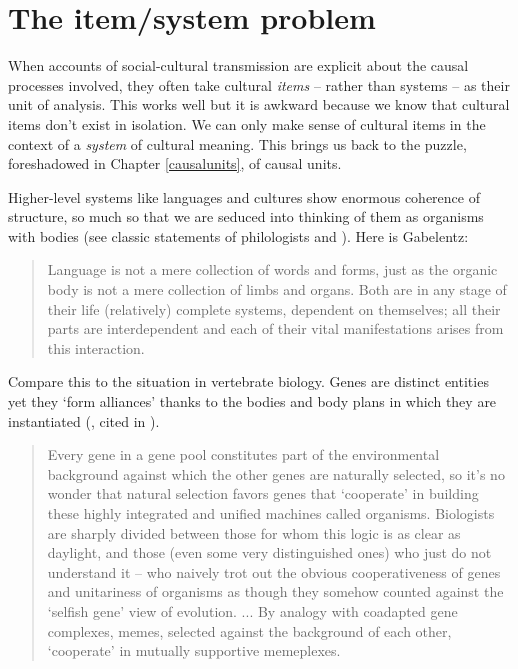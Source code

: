 
\chapter{The item/system problem}
\label{itemsystemproblem}


When accounts of social-cultural transmission are explicit about the 
causal processes involved, they often take cultural \textit{items} -- rather than systems -- as their unit of analysis. This works well 
but it is awkward because we know that cultural items don't exist in 
isolation. We can only make sense of cultural items in the context of a 
\textit{system} of cultural meaning. This brings us back to the puzzle, foreshadowed in Chapter \ref{causalunits}, of causal units. 



Higher-level systems like languages and cultures show enormous coherence 
of structure, so much so that we are seduced into thinking of them as organisms with 
bodies (see classic statements of philologists \citealt{gabelentz_sprachwissenschaft_1891} and \citealt[16]{meillet_linguistique_1926}). Here is Gabelentz:

\begin{quotation}
Language is not a mere collection of words and forms, just as the organic body is not a mere collection of limbs and organs. Both are in any stage of their life (relatively) complete systems, dependent on themselves; all their parts are interdependent and each of their vital manifestations arises from this interaction. \citep[10]{gabelentz_sprachwissenschaft_1891}
\end{quotation}

Compare this to the situation in vertebrate 
biology. Genes are distinct entities yet they \textquoteleft form 
alliances' thanks to the bodies and body plans in which they are 
instantiated (\citealt{gould_ontogeny_1977}, cited in \citealt[117]{dawkins_extended_1982}). 

\begin{quotation}
Every gene in a gene pool constitutes part of the environmental background against which the other genes are naturally selected, so it's no wonder that natural selection favors genes that `cooperate' in building these highly integrated and unified machines called organisms.  Biologists are sharply divided between those for whom this logic is as clear as daylight, and those (even some very distinguished ones) who just do not understand it -- who naively trot out the obvious cooperativeness of genes and unitariness of organisms as though they somehow counted against the `selfish gene' view of evolution. ... By analogy with coadapted gene complexes, memes, selected against the background of each other, `cooperate' in mutually supportive memeplexes. \citep[xv]{DawkinsMemeForeword1999}
\end{quotation}

